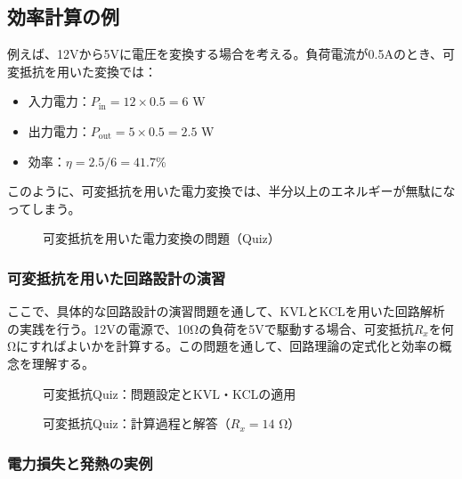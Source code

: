 \subsection{効率計算の例}

例えば、12Vから5Vに電圧を変換する場合を考える。負荷電流が0.5Aのとき、可変抵抗を用いた変換では：

\begin{itemize}
\item 入力電力：$P_{\text{in}} = 12 \times 0.5 = 6$ W
\item 出力電力：$P_{\text{out}} = 5 \times 0.5 = 2.5$ W
\item 効率：$\eta = 2.5/6 = 41.7$\%
\end{itemize}

このように、可変抵抗を用いた電力変換では、半分以上のエネルギーが無駄になってしまう。

\begin{figure}[H]
\centering
{}
\caption{可変抵抗を用いた電力変換の問題（Quiz）}
\label{fig:resistor_quiz}
\end{figure}

\subsubsection{可変抵抗を用いた回路設計の演習}

ここで、具体的な回路設計の演習問題を通して、KVLとKCLを用いた回路解析の実践を行う。12Vの電源で、10Ωの負荷を5Vで駆動する場合、可変抵抗$R_x$を何Ωにすればよいかを計算する。この問題を通して、回路理論の定式化と効率の概念を理解する。

\begin{figure}[H]
\centering
{}
\caption{可変抵抗Quiz：問題設定とKVL・KCLの適用}
\label{fig:resistor_quiz_solution}
\end{figure}

\begin{figure}[H]
\centering
{}
\caption{可変抵抗Quiz：計算過程と解答（$R_x = 14$ Ω）}
\label{fig:resistor_calculation}
\end{figure}

\subsubsection{電力損失と発熱の実例}

